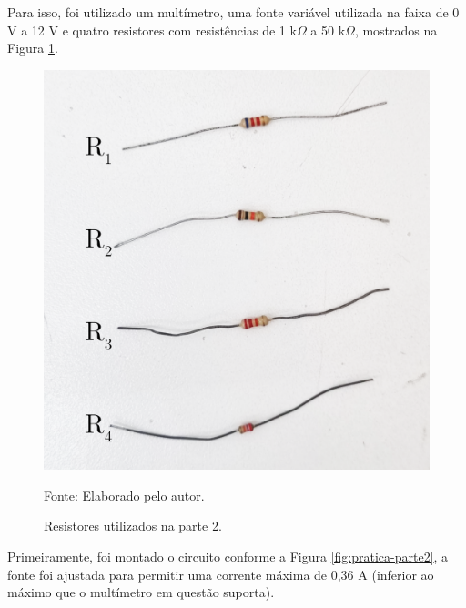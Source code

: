 \documentclass[12pt]{article}
\begin{document}
Para isso, foi utilizado um multímetro, uma fonte variável utilizada na faixa de 0 V a 12 V e quatro resistores com resistências de 1 k$\Omega$ a 50 k$\Omega$, mostrados na Figura \ref{fig:pratica2}.

\begin{figure}[H]
    \centering
    \caption{Resistores utilizados na parte 2.}
    \begin{minipage}{0.45\textwidth}
        \centering
        \includegraphics[width=\textwidth]{external-figures/resistores-pratica2.png}\\
        \raggedright\footnotesize{Fonte: Elaborado pelo autor.}
        \label{fig:pratica2}
    \end{minipage}
\end{figure}

Primeiramente, foi montado o circuito conforme a Figura \ref{fig:pratica-parte2}, a fonte foi ajustada para permitir uma corrente máxima de 0,36 A (inferior ao máximo que o multímetro em questão suporta).
\end{document}
